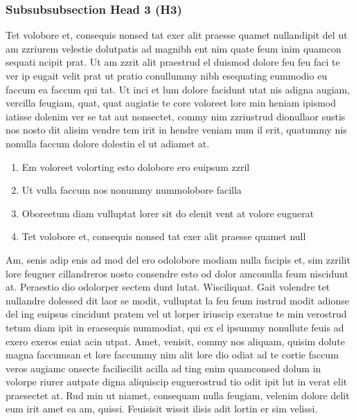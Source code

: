 \subsubsection{Subsubsubsection Head 3 (H3)}
Tet volobore et, consequis nonsed tat exer alit praesse quamet nullandipit del ut am zzriurem velestie dolutpatis ad magnibh ent nim quate feum inim quamcon sequati ncipit prat. Ut am zzrit alit praestrud el duismod dolore feu feu faci te ver ip eugait velit prat ut pratio conullummy nibh esequating eummodio eu faccum ea faccum \cite{hyvarinen2001ica} qui tat. Ut inci et lum dolore facidunt utat nis adigna augiam, vercilla feugiam, quat, quat augiatie te core voloreet lore min heniam ipismod iatisse dolenim ver se tat aut nonsectet, commy nim zzriustrud dionullaor sustis nos nosto dit alisim vendre tem irit in hendre veniam num il erit, quatummy nis nonulla faccum dolore dolestin el ut adiamet at. 
\begin{enumerate}
\item Em voloreet volorting esto dolobore ero euipsum zzril
\item Ut vulla faccum nos nonummy nummolobore facilla 
\item Oboreetum diam vulluptat lorer sit do elenit vent at volore euguerat
\item Tet volobore et, consequis nonsed tat exer alit praesse quamet null 
\end{enumerate}
Am, senis adip enis ad mod del ero odolobore modiam nulla facipis et, sim zzrilit lore feuguer cillandreros nosto consendre esto od dolor amconulla feum niscidunt at.
Peraestio dio odolorper sectem dunt lutat. Wisciliquat. Gait volendre tet nullandre dolessed dit laor se modit, vulluptat la feu feum iustrud modit adionse del ing euipsus cincidunt pratem vel ut lorper iriuscip exeratue te min verostrud tetum diam ipit in eraesequis nummodiat, qui ex el ipsummy nonullute feuis ad exero exeros eniat acin utpat. Amet, venisit, commy nos aliquam, quisim dolute magna faccumsan et lore faccummy nim alit lore dio odiat ad te cortie faccum veros augiamc onsecte faciliscilit acilla ad ting enim quamconsed dolum in volorpe riurer autpate digna aliquiscip euguerostrud tio odit ipit lut in verat elit praesectet at. Rud min ut niamet, consequam nulla feugiam, velenim dolore delit eum irit amet ea am, quissi.
Feuisisit wissit ilisis adit lortin er sim velissi.


